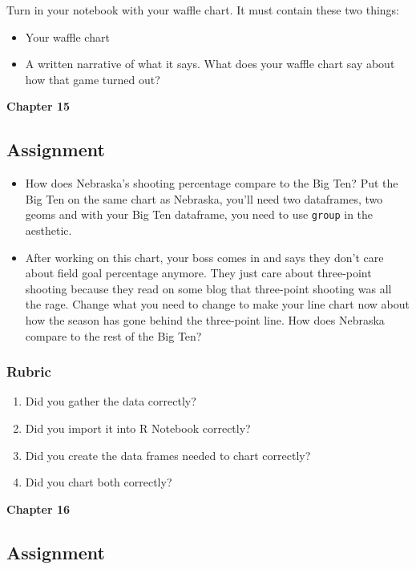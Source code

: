 \documentclass[]{book}
\providecommand{\tightlist}{%
  \setlength{\itemsep}{0pt}\setlength{\parskip}{0pt}}
\begin{document}
Turn in your notebook with your waffle chart. It must contain these two
things:

\begin{itemize}
\tightlist
\item
  Your waffle chart
\item
  A written narrative of what it says. What does your waffle chart say
  about how that game turned out?
\end{itemize}

\textbf{Chapter 15}

\subsection{Assignment}\label{assignment-8}

\begin{itemize}
\item
  How does Nebraska's shooting percentage compare to the Big Ten? Put
  the Big Ten on the same chart as Nebraska, you'll need two dataframes,
  two geoms and with your Big Ten dataframe, you need to use
  \texttt{group} in the aesthetic.
\item
  After working on this chart, your boss comes in and says they don't
  care about field goal percentage anymore. They just care about
  three-point shooting because they read on some blog that three-point
  shooting was all the rage. Change what you need to change to make your
  line chart now about how the season has gone behind the three-point
  line. How does Nebraska compare to the rest of the Big Ten?
\end{itemize}

\subsubsection{Rubric}\label{rubric-5}

\begin{enumerate}
\def\labelenumi{\arabic{enumi}.}
\tightlist
\item
  Did you gather the data correctly?
\item
  Did you import it into R Notebook correctly?
\item
  Did you create the data frames needed to chart correctly?
\item
  Did you chart both correctly?
\end{enumerate}

\textbf{Chapter 16}

\subsection{Assignment}\label{assignment-9}
\end{document}
